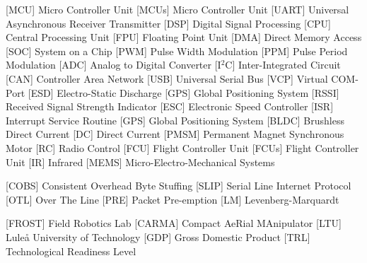        [MCU]           {Micro Controller Unit}
 [MCUs]          {Micro Controller Unit}
      [UART]          {Universal Asynchronous Receiver Transmitter}
       [DSP]           {Digital Signal Processing}
       [CPU]           {Central Processing Unit}
       [FPU]           {Floating Point Unit}
       [DMA]           {Direct Memory Access}
       [SOC]           {System on a Chip}
       [PWM]           {Pulse Width Modulation}
       [PPM]           {Pulse Period Modulation}
       [ADC]           {Analog to Digital Converter}
       [I$^2$C]        {Inter-Integrated Circuit}
       [CAN]           {Controller Area Network}
       [USB]           {Universal Serial Bus}
       [VCP]           {Virtual COM-Port}
       [ESD]           {Electro-Static Discharge}
       [GPS]           {Global Positioning System}
      [RSSI]          {Received Signal Strength Indicator}
       [ESC]           {Electronic Speed Controller}
       [ISR]           {Interrupt Service Routine}
       [GPS]           {Global Positioning System}
      [BLDC]          {Brushless Direct Current}
        [DC]            {Direct Current}
      [PMSM]          {Permanent Magnet Synchronous Motor}
        [RC]            {Radio Control}
       [FCU]           {Flight Controller Unit}
 [FCUs]          {Flight Controller Unit}
        [IR]            {Infrared}
      [MEMS]          {Micro-Electro-Mechanical Systems}

      [COBS]          {Consistent Overhead Byte Stuffing}
      [SLIP]          {Serial Line Internet Protocol}
       [OTL]           {Over The Line}
       [PRE]           {Packet Pre-emption}
        [LM]            {Levenberg-Marquardt}

     [FROST]         {Field Robotics Lab}
     [CARMA]         {Compact AeRial MAnipulator}
       [LTU]           {Lule{\aa} University of Technology}
       [GDP]           {Gross Domestic Product}
       [TRL]           {Technological Readiness Level}
